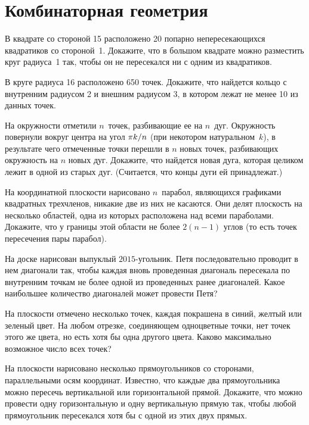 
\section*{Комбинаторная геометрия}


\begingroup \def\piconst{\mathrm{\pi}}

\begin{problems}

\item
В квадрате со стороной 15 расположено 20 попарно непересекающихся квадратиков
со стороной~1.
Докажите, что в большом квадрате можно разместить круг радиуса~1 так, чтобы
он не пересекался ни с одним из квадратиков.

\item
В круге радиуса 16 расположено 650 точек.
Докажите, что найдется кольцо с внутренним радиусом 2 и внешним радиусом 3,
в котором лежат не менее 10 из данных точек.

\item
На окружности отметили $n$~точек, разбивающие ее на $n$~дуг.
Окружность повернули вокруг центра на угол $\piconst k / n$ (при некотором
натуральном~$k$), в результате чего отмеченные точки перешли в $n$ новых точек,
разбивающих окружность на $n$ новых дуг.
Докажите, что найдется новая дуга, которая целиком лежит в одной из старых дуг.
(Считается, что концы дуги ей принадлежат.)

\item
На координатной плоскости нарисовано $n$~парабол, являющихся графиками
квадратных трехчленов, никакие две из них не касаются.
Они делят плоскость на несколько областей, одна из которых расположена над
всеми параболами.
Докажите, что у границы этой области не более $2 (n - 1)$ углов (то есть точек
пересечения пары парабол).

\item
На доске нарисован выпуклый $2015$-угольник.
Петя последовательно проводит в нем диагонали так, чтобы каждая вновь
проведенная диагональ пересекала по внутренним точкам не более одной
из проведенных ранее диагоналей.
Какое наибольшее количество диагоналей может провести Петя?

\item
На плоскости отмечено несколько точек, каждая покрашена в синий, желтый или
зеленый цвет.
На любом отрезке, соединяющем одноцветные точки, нет точек этого же цвета,
но есть хотя бы одна другого цвета.
Каково максимально возможное число всех точек?

\item
На плоскости нарисовано несколько прямоугольников со сторонами, параллельными
осям координат.
Известно, что каждые два прямоугольника можно пересечь вертикальной или
горизонтальной прямой.
Докажите, что можно провести одну горизонтальную и одну вертикальную прямую
так, чтобы любой прямоугольник пересекался хотя бы с одной из этих двух прямых.

\end{problems}

\endgroup %

